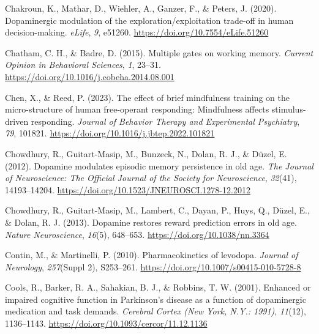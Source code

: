 \documentclass[
  man]{apa6}
\newlength{\cslhangindent}
\newlength{\cslentryspacingunit} %
\newenvironment{CSLReferences}[2] %
 {%
  \setlength{\parindent}{0pt}
  \ifodd #1
  \let\oldpar\par
  \def\par{\hangindent=\cslhangindent\oldpar}
  \fi
  \setlength{\parskip}{#2\cslentryspacingunit}
 }%
 {}
\begin{document}
\begin{CSLReferences}{1}{0}
\leavevmode{}%
Chakroun, K., Mathar, D., Wiehler, A., Ganzer, F., \& Peters, J. (2020). Dopaminergic modulation of the exploration/exploitation trade-off in human decision-making. \emph{eLife}, \emph{9}, e51260. \url{https://doi.org/10.7554/eLife.51260}

\leavevmode{}%
Chatham, C. H., \& Badre, D. (2015). Multiple gates on working memory. \emph{Current Opinion in Behavioral Sciences}, \emph{1}, 23--31. \url{https://doi.org/10.1016/j.cobeha.2014.08.001}

\leavevmode{}%
Chen, X., \& Reed, P. (2023). The effect of brief mindfulness training on the micro-structure of human free-operant responding: {Mindfulness} affects stimulus-driven responding. \emph{Journal of Behavior Therapy and Experimental Psychiatry}, \emph{79}, 101821. \url{https://doi.org/10.1016/j.jbtep.2022.101821}

\leavevmode{}%
Chowdhury, R., Guitart-Masip, M., Bunzeck, N., Dolan, R. J., \& Düzel, E. (2012). Dopamine modulates episodic memory persistence in old age. \emph{The Journal of Neuroscience: The Official Journal of the Society for Neuroscience}, \emph{32}(41), 14193--14204. \url{https://doi.org/10.1523/JNEUROSCI.1278-12.2012}

\leavevmode{}%
Chowdhury, R., Guitart-Masip, M., Lambert, C., Dayan, P., Huys, Q., Düzel, E., \& Dolan, R. J. (2013). Dopamine restores reward prediction errors in old age. \emph{Nature Neuroscience}, \emph{16}(5), 648--653. \url{https://doi.org/10.1038/nn.3364}

\leavevmode{}%
Contin, M., \& Martinelli, P. (2010). Pharmacokinetics of levodopa. \emph{Journal of Neurology}, \emph{257}(Suppl 2), S253--261. \url{https://doi.org/10.1007/s00415-010-5728-8}

\leavevmode{}%
Cools, R., Barker, R. A., Sahakian, B. J., \& Robbins, T. W. (2001). Enhanced or impaired cognitive function in {Parkinson}'s disease as a function of dopaminergic medication and task demands. \emph{Cerebral Cortex (New York, N.Y.: 1991)}, \emph{11}(12), 1136--1143. \url{https://doi.org/10.1093/cercor/11.12.1136}


\end{CSLReferences}
\end{document}
